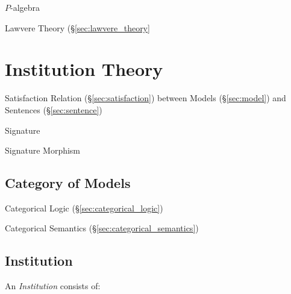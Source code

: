 $P$-algebra

Lawvere Theory (\S\ref{sec:lawvere_theory}



\section{Institution Theory}\label{sec:institution_theory}

Satisfaction Relation (\S\ref{sec:satisfaction}) between Models
(\S\ref{sec:model}) and Sentences (\S\ref{sec:sentence})

Signature

Signature Morphism



\subsection{Category of Models}\label{sec:category_of_models}

Categorical Logic (\S\ref{sec:categorical_logic})

Categorical Semantics (\S\ref{sec:categorical_semantics})



\subsection{Institution}\label{sec:institution}

An \emph{Institution} consists of:

